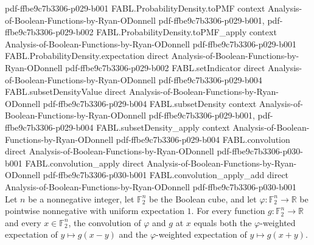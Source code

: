 \begin{theorem}
  {pdf-ffbe9c7b3306-p029-b001}
\proofstep
  {FABL.ProbabilityDensity.toPMF}
  {context}
  {Analysis-of-Boolean-Functions-by-Ryan-ODonnell}
  {pdf-ffbe9c7b3306-p029-b001,
    pdf-ffbe9c7b3306-p029-b002}
\proofstep
  {FABL.ProbabilityDensity.toPMF_apply}
  {context}
  {Analysis-of-Boolean-Functions-by-Ryan-ODonnell}
  {pdf-ffbe9c7b3306-p029-b001}
\proofstep
  {FABL.ProbabilityDensity.expectation}
  {direct}
  {Analysis-of-Boolean-Functions-by-Ryan-ODonnell}
  {pdf-ffbe9c7b3306-p029-b002}
\proofstep
  {FABL.setIndicator}
  {direct}
  {Analysis-of-Boolean-Functions-by-Ryan-ODonnell}
  {pdf-ffbe9c7b3306-p029-b004}
\proofstep
  {FABL.subsetDensityValue}
  {direct}
  {Analysis-of-Boolean-Functions-by-Ryan-ODonnell}
  {pdf-ffbe9c7b3306-p029-b004}
\proofstep
  {FABL.subsetDensity}
  {context}
  {Analysis-of-Boolean-Functions-by-Ryan-ODonnell}
  {pdf-ffbe9c7b3306-p029-b001,
    pdf-ffbe9c7b3306-p029-b004}
\proofstep
  {FABL.subsetDensity_apply}
  {context}
  {Analysis-of-Boolean-Functions-by-Ryan-ODonnell}
  {pdf-ffbe9c7b3306-p029-b004}
\proofstep
  {FABL.convolution}
  {direct}
  {Analysis-of-Boolean-Functions-by-Ryan-ODonnell}
  {pdf-ffbe9c7b3306-p030-b001}
\proofstep
  {FABL.convolution_apply}
  {direct}
  {Analysis-of-Boolean-Functions-by-Ryan-ODonnell}
  {pdf-ffbe9c7b3306-p030-b001}
\proofstep
  {FABL.convolution_apply_add}
  {direct}
  {Analysis-of-Boolean-Functions-by-Ryan-ODonnell}
  {pdf-ffbe9c7b3306-p030-b001}
Let $n$ be a nonnegative integer, let $\mathbb{F}_2^n$ be the Boolean cube, and let
$\varphi:\mathbb{F}_2^n\to\mathbb{R}$ be pointwise nonnegative with uniform expectation
$1$. For every function $g:\mathbb{F}_2^n\to\mathbb{R}$ and every $x\in\mathbb{F}_2^n$,
the convolution of $\varphi$ and $g$ at $x$ equals both the $\varphi$-weighted
expectation of $y\mapsto g(x-y)$ and the $\varphi$-weighted expectation of $y\mapsto
g(x+y)$.
\end{theorem}

